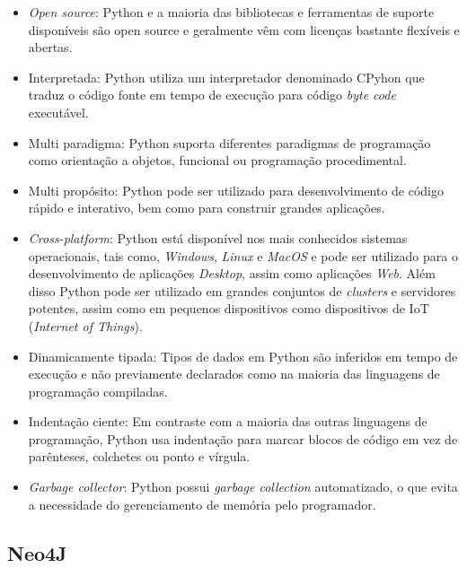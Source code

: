 \begin{itemize}

\item \emph{Open source}: Python e a maioria das bibliotecas e ferramentas de suporte disponíveis são
open source e geralmente vêm com licenças bastante flexíveis e abertas.

\item Interpretada: Python utiliza um interpretador denominado CPyhon que traduz o código fonte em tempo de execução para código \emph{byte code} executável.

\item Multi paradigma: Python suporta diferentes paradigmas de programação como orientação a objetos, funcional ou programação procedimental.

\item Multi propósito: Python pode ser utilizado para desenvolvimento de código rápido e interativo, bem como para construir grandes aplicações.

\item \emph{Cross-platform}: Python está disponível nos mais conhecidos sistemas operacionais, tais como, \emph{Windows}, \emph{Linux} e \emph{MacOS} e pode ser utilizado para o desenvolvimento de aplicações \emph{Desktop}, assim como aplicações \emph{Web}. Além disso Python pode ser utilizado em grandes conjuntos de \emph{clusters} e servidores potentes, assim como em pequenos dispositivos como dispositivos de IoT (\emph{Internet of Things}).

\item Dinamicamente tipada: Tipos de dados em Python são inferidos em tempo de execução e não previamente declarados como na maioria das linguagens de programação compiladas. 

\item Indentação ciente: Em contraste com a maioria das outras linguagens de programação, Python usa indentação para marcar blocos de código em vez de parênteses, colchetes ou ponto e vírgula.

\item \emph{Garbage collector}: Python possui \emph{garbage collection} automatizado, o que evita a necessidade do gerenciamento de memória pelo programador.

\end{itemize}


\subsection{Neo4J}

